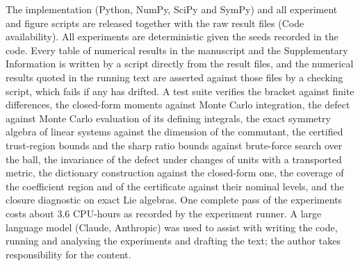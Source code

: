 The implementation (Python, NumPy, SciPy and SymPy) and all experiment and
figure scripts are released together with the raw result files (Code
availability). All experiments are deterministic given the seeds recorded in
the code. Every table of numerical results in the manuscript and the
Supplementary Information is written by a script directly from the result
files, and the numerical
results quoted in the running text are asserted against those files by a
checking script, which fails if any has drifted. A test suite verifies the bracket against finite
differences, the closed-form moments against Monte Carlo integration, the
defect against Monte Carlo evaluation of its defining integrals, the exact
symmetry algebra of linear systems against the dimension of the commutant, the
certified trust-region bounds and the sharp ratio bounds against brute-force
search over the ball, the invariance of the defect under changes of units with
a transported metric, the dictionary construction against the closed-form one,
the coverage of the coefficient region and of the certificate against their
nominal levels, and the closure diagnostic on exact Lie algebras. One complete
pass of the experiments costs about $3.6$ CPU-hours as recorded by the
experiment runner. A large language model (Claude, Anthropic) was used to
assist with writing the code, running and analysing the experiments and
drafting the text; the author takes responsibility for the content.
